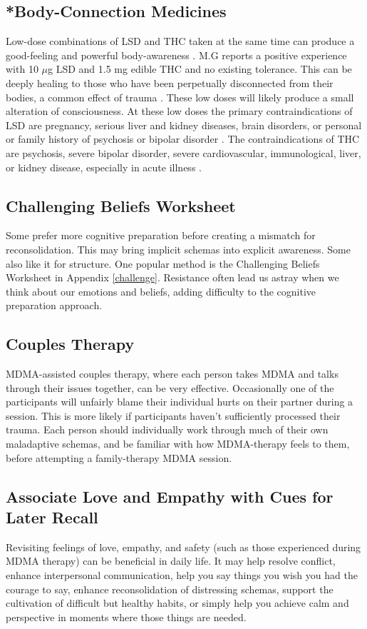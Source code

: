 \documentclass[12pt,letterpaper]{article}
\begin{document}
\subsection{*Body-Connection Medicines}
Low-dose combinations of LSD and THC taken at the same time can produce a good-feeling and powerful body-awareness \cite{colemanPsychedelicPsychotherapy}. M.G reports a positive experience with 10 $\mu$g LSD and 1.5 mg edible THC and no existing tolerance. This can be deeply healing to those who have been perpetually disconnected from their bodies, a common effect of trauma \cite{vanderKolkBody}. These low doses will likely produce a small alteration of consciousness. At these low doses the primary contraindications of LSD are pregnancy, serious liver and kidney diseases, brain disorders, or personal or family history of psychosis or bipolar disorder \cite{schlagPsychedelicAdverseEffects,passiePsycholytic}. The contraindications of THC are psychosis, severe bipolar disorder, severe cardiovascular, immunological, liver, or kidney disease, especially in acute illness \cite{DCCannabis}.
\subsection{Challenging Beliefs Worksheet}
\label{challengingBeliefsWorksheet}
Some prefer more cognitive preparation before creating a mismatch for reconsolidation.  This may bring implicit schemas into explicit awareness. Some also like it for structure. One popular method is the Challenging Beliefs Worksheet in Appendix \ref{challenge}. Resistance often lead us astray when we think about our emotions and beliefs, adding difficulty to the cognitive preparation approach.
\subsection{Couples Therapy}
MDMA-assisted couples therapy, where each person takes MDMA and talks through their issues together, can be very effective. Occasionally one of the participants will unfairly blame their individual hurts on their partner during a session. This is more likely if participants haven't sufficiently processed their trauma. Each person should individually work through much of their own maladaptive schemas, and be familiar with how MDMA-therapy feels to them, before attempting a family-therapy MDMA session.
\subsection{Associate Love and Empathy with Cues for Later Recall}
Revisiting feelings of love, empathy, and safety (such as those experienced during MDMA therapy) can be beneficial in daily life. It may help resolve conflict, enhance interpersonal communication, help you say things you wish you had the courage to say, enhance reconsolidation of distressing schemas, support the cultivation of difficult but healthy habits, or simply help you achieve calm and perspective in moments where those things are needed.
\end{document}
